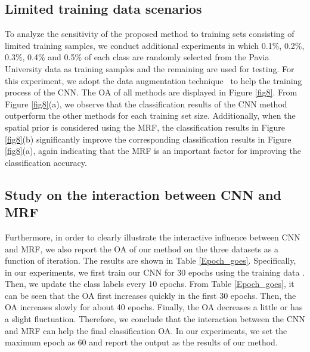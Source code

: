\documentclass[journal]{IEEEtran}
\begin{document}
		\subsection{Limited training data scenarios}
		To analyze the sensitivity of the proposed method to training sets consisting of limited training samples, we conduct additional experiments in which 0.1\%, 0.2\%, 0.3\%, 0.4\% and 0.5\% of each class are randomly selected from the Pavia University data as training samples and the remaining are used for testing. For this experiment, we adopt the data augmentation technique~\cite{krizhevsky2012imagenet} to help the training process of the CNN. The OA of all methods are displayed in Figure  \ref{fig8}. From Figure \ref{fig8}(a), we observe that the classification results of the CNN method outperform the other methods for each training set size. Additionally, when the spatial prior is considered using the MRF, the {{classification}} results in Figure \ref{fig8}(b) significantly improve the corresponding classification results in Figure  \ref{fig8}(a), again indicating that the MRF is an important factor for improving the classification accuracy.
		
		\subsection{Study on the interaction between CNN and MRF}
		{{Furthermore, in order to clearly illustrate the interactive influence between CNN and MRF, we also report the OA of our method on the three datasets as a function of iteration. The results are shown in Table \ref{Epoch_goes}. Specifically, in our experiments, we first train our CNN for 30 epochs using the training data . Then, we update the class labels  every 10 epochs. From Table \ref{Epoch_goes}, it can be seen that the OA first increases quickly in the first 30 epochs. Then, the OA increases slowly for about 40 epochs. Finally, the OA decreases a little or has a slight fluctuation. Therefore, we conclude that the interaction between the CNN and MRF can help the final classification OA. In our experiments, we set the maximum epoch as 60 and report the output as the results of our method.}}
		
\end{document}
